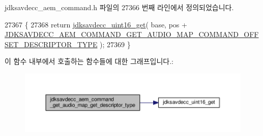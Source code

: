 jdksavdecc\+\_\+aem\+\_\+command.\+h 파일의 27366 번째 라인에서 정의되었습니다.


\begin{DoxyCode}
27367 \{
27368     \textcolor{keywordflow}{return} \hyperlink{group__endian_ga3fbbbc20be954aa61e039872965b0dc9}{jdksavdecc\_uint16\_get}( base, pos + 
      \hyperlink{group__command__get__audio__map_ga1fc1effdd030f99bd3f435ce86d5e86c}{JDKSAVDECC\_AEM\_COMMAND\_GET\_AUDIO\_MAP\_COMMAND\_OFFSET\_DESCRIPTOR\_TYPE}
       );
27369 \}
\end{DoxyCode}


이 함수 내부에서 호출하는 함수들에 대한 그래프입니다.\+:
\nopagebreak
\begin{figure}[H]
\begin{center}
\leavevmode
\includegraphics[width=350pt]{group__command__get__audio__map_gaffddbc426fe3b47801bf90ce6866ea4d_cgraph}
\end{center}
\end{figure}




